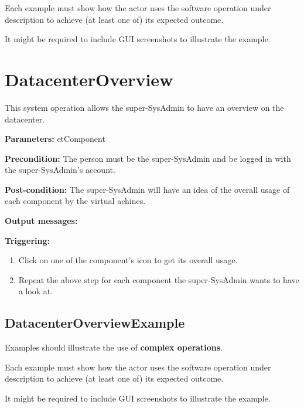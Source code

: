 Each example must show how the actor uses the software operation under
description to achieve (at least one of) its expected outcome.

It might be required to include GUI screenshots to illustrate the example.






\section{DatacenterOverview}
\label{operation:datacenteroverview}
This system operation allows the super-SysAdmin to have an overview on the
datacenter.

\begin{description}

\item \textbf{Parameters:} etComponent
\item \textbf{Precondition:} The person must be the super-SysAdmin and be logged
in with the super-SysAdmin's account.
\item \textbf{Post-condition:} The super-SysAdmin will have an idea of the
overall usage of each component by the virtual achines.
\item \textbf{Output messages:}

\item \textbf{Triggering:}
\begin{enumerate}
\item Click on one of the component's icon to get its overall usage.
\item Repeat the above step for each component the super-SysAdmin wants to have a
look at.
\end{enumerate}

 
\end{description}

 
\subsection{DatacenterOverviewExample}
Examples should illustrate the use of \textbf{complex operations}.

Each example must show how the actor uses the software operation under
description to achieve (at least one of) its expected outcome.

It might be required to include GUI screenshots to illustrate the example.






